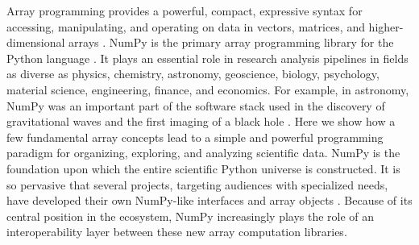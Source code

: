 




Array programming provides a powerful, compact, expressive syntax for accessing,
manipulating, and operating on data in vectors, matrices, and
higher-dimensional arrays \cite{iverson1980notation}.
NumPy is the primary array programming library for the Python language
\cite{dubois2007guest,oliphant2007python,millman2011python,perez2011python}.
% 
It plays an essential role in research analysis pipelines in fields as
diverse as physics, chemistry, astronomy, geoscience, biology, psychology,
material science, engineering, finance, and economics.
For example, in astronomy, NumPy was an important part of the software stack used
in the discovery of gravitational waves \cite{abbott2016observation}
and the first imaging of a black hole \cite{eht-imaging}.
Here we show how a few fundamental array concepts lead to a simple and
powerful programming paradigm for organizing, exploring, and analyzing
scientific data.
NumPy is the foundation upon which the entire scientific Python
universe is constructed. It is so pervasive that several projects,
targeting audiences with specialized needs, have developed their own
NumPy-like interfaces and array objects%
. Because of its central position in the
ecosystem, NumPy increasingly plays the role of an interoperability layer
between these new array computation libraries.
